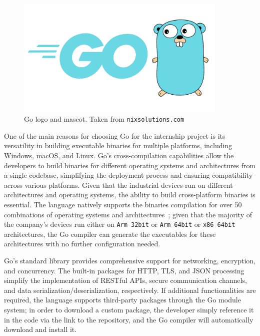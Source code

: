 \begin{figure}[h]
  \centering
  \includegraphics[width=0.9\textwidth]{chapters/04/assets/golang}
  \caption{Go logo and mascot. Taken from \texttt{nixsolutions.com}}
  \label{fig:go-logo-mascot}
\end{figure}

One of the main reasons for choosing Go for the internship project is its versatility in building executable binaries for multiple platforms, including Windows, macOS, and Linux. Go's cross-compilation capabilities allow the developers to build binaries for different operating systems and architectures from a single codebase, simplifying the deployment process and ensuring compatibility across various platforms. Given that the industrial devices run on different architectures and operating systems, the ability to build cross-platform binaries is essential. The language natively supports the binaries compilation for over 50 combinations of operating systems and architectures~\cite{go-lang-compilation-combo}; given that the majority of the company's devices run either on \texttt{Arm 32bit} or \texttt{Arm 64bit} or \texttt{x86 64bit} architectures, the Go compiler can generate the executables for these architectures with no further configuration needed.

Go's standard library provides comprehensive support for networking, encryption, and concurrency. The built-in packages for HTTP, TLS, and JSON processing simplify the implementation of RESTful APIs, secure communication channels, and data serialization/deserialization, respectively. If additional functionalities are required, the language supports third-party packages through the Go module system; in order to download a custom package, the developer simply reference it in the code via the link to the repository, and the Go compiler will automatically download and install it.

